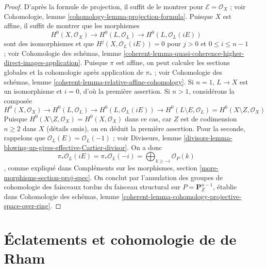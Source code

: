 \begin{proof}
D'après la formule de projection, il suffit de le montrer pour
$\mathcal{E} = \mathcal{O}_X$ ; voir Cohomologie, lemme
\ref{cohomology-lemma-projection-formula}.
Puisque $X$ est affine, il suffit de montrer que les morphismes
$$
H^0(X, \mathcal{O}_X) \to
H^0(L, \mathcal{O}_L) \to
H^0(L, \mathcal{O}_L(iE))
$$
sont des isomorphismes et que $H^j(X, \mathcal{O}_L(iE)) = 0$
pour $j > 0$ et $0 \leq i \leq n - 1$ ; voir Cohomologie des schémas, lemme
\ref{coherent-lemma-quasi-coherence-higher-direct-images-application}.
Puisque $\pi$ est affine, on peut calculer les sections globales et la
cohomologie après application de $\pi_*$ ; voir Cohomologie des schémas, lemme
\ref{coherent-lemma-relative-affine-cohomology}. Si $n = 1$,
$L \to X$ est un isomorphisme et $i = 0$, d'où la première assertion.
Si $n > 1$, considérons la composée
$$
H^0(X, \mathcal{O}_X) \to H^0(L, \mathcal{O}_L) \to
H^0(L, \mathcal{O}_L(iE)) \to H^0(L \setminus E, \mathcal{O}_L) =
H^0(X \setminus Z, \mathcal{O}_X)
$$
Puisque
$H^0(X \setminus Z, \mathcal{O}_X) = H^0(X, \mathcal{O}_X)$ dans ce
cas, car $Z$ est de codimension $n \geq 2$ dans $X$ (détails omis), on en déduit
la première assertion. Pour la seconde, rappelons que
$\mathcal{O}_L(E) = \mathcal{O}_L(-1)$ ; voir Diviseurs, lemme
\ref{divisors-lemma-blowing-up-gives-effective-Cartier-divisor}.
On a donc
$$
\pi_*\mathcal{O}_L(iE) =
\pi_*\mathcal{O}_L(-i) =
\bigoplus\nolimits_{k \geq -i} \mathcal{O}_P(k)
$$,
comme expliqué dans
Compléments sur les morphismes, section \ref{more-morphisms-section-proj-spec}.
On conclut par l'annulation des groupes de cohomologie des faisceaux tordus
du faisceau structural sur $P = \mathbf{P}^{n - 1}_Z$,
établie dans Cohomologie des schémas, lemme
\ref{coherent-lemma-cohomology-projective-space-over-ring}.
\end{proof}























\section{Éclatements et cohomologie de de Rham}
\label{section-blowing-up}

